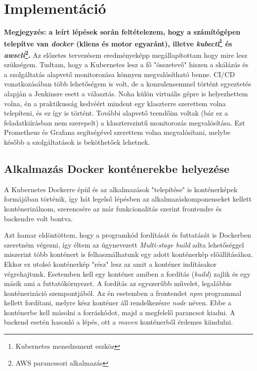 \chapter{Implementáció}
\textbf{Megjegyzés: a leírt lépések során feltételezem, hogy a számítógépen telepítve van \textit{docker} (kliens és motor egyaránt), illetve \textit{kubectl}\footnote{Kubernetes menedzsment eszköz} és \textit{awscli}\footnote{AWS parancssori alkalmazás}.}
\vskip 0.1in
Az előzetes tervezésem eredményeképp megállapítottam hogy mire lesz szükségem. Tudtam, hogy a Kubernetes lesz a fő "összetevő" hiszen a skálázás és a szolgáltatás alapvető monitorozása könnyen megvalósítható benne. CI/CD vonatkozásában több lehetőségem is volt, de a konzulensemmel történt egyeztetés alapján a Jenkinsre esett a választás. Noha külön virtuális gépre is helyezhettem volna, én a praktikusság kedvéért mindent egy klaszterre szerettem volna telepíteni, és ez így is történt. További alapvető teendőim voltak (bár ez a feladatkiírásban nem szerepelt) a klaszterszintű monitorozás megvalósítása. Ezt Prometheus és Grafana segítségével szerettem volna megvalósítani, melybe később a szolgáltatások is beköthetőek lehetnek.
\section{Alkalmazás Docker konténerekbe helyezése}
A Kubernetes Dockerre épül és az alkalmazások "telepítése" is konténerképek formájában történik, így hát legelső lépésben az alkalmazáskomponenseket kellett konténerizálnom, szerencsére az már funkcionalitás szerint frontendre és backendre volt bontva.

Azt hamar eldöntöttem, hogy a programkód fordítását és futtatását is Dockerben szeretném végezni, így éltem az úgynevezett \textit{Multi-stage build}\cite{multistage_docker} adta lehetőséggel miszerint több konténert is felhasználhatunk egy adott konténerkép előállításához. Ekkor ez utolsó konténerkép "rész" lesz az amit a konténer indításakor végrehajtunk. Esetemben kell egy konténer amiben a fordítás (\textit{build}) zajlik és egy másik ami a futtatókörnyezet. A fordítás az egyszerűbb művelet, legalábbis konténerizáció szempontjából. Az én esetemben a frontendet \textit{npm} programmal kellett fordítani, melyre kész konténer áll rendelkezésre \textit{node} néven. Ebbe a konténerbe kell másolni a forráskódot, majd a megfelelő parancsot kiadni. A backend esetén hasonló a lépés, ott a \textit{maven} konténerből érdemes kiindulni.

